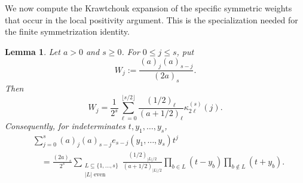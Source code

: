 \documentclass[12pt]{amsart}
\newtheorem{Lemma}[Theorem]{Lemma}
\theoremstyle{definition}
\begin{document}
We now compute the Krawtchouk expansion of the specific symmetric weights
that occur in the local positivity argument.  This is the specialization
needed for the finite symmetrization identity.

\begin{Lemma} \label{lem:finite-symmetrization}
Let $a>0$ and $s\ge0$.  For $0\le j\le s$, put
\[
W_j:=\frac{(a)_j(a)_{s-j}}{(2a)_s}.
\]
Then
\begin{equation}\label{9.4}
W_j
=
\frac1{2^s}
\sum_{\ell=0}^{\lfloor s/2\rfloor}
\frac{(1/2)_\ell}{(a+1/2)_\ell}
\kappa_{2\ell}^{(s)}(j).
\end{equation}
Consequently, for indeterminates $t,y_1,\ldots,y_s$,
\begin{equation}\label{9.5}
\begin{aligned}
&\sum_{j=0}^s
(a)_j(a)_{s-j}e_{s-j}(y_1,\ldots,y_s)t^j\\
&\quad=
\frac{(2a)_s}{2^s}
\sum_{\substack{L\subseteq\{1,\ldots,s\}\\|L|\text{ even}}}
\frac{(1/2)_{|L|/2}}{(a+1/2)_{|L|/2}}
\prod_{b\in L}(t-y_b)
\prod_{b\notin L}(t+y_b).
\end{aligned}
\end{equation}
\end{Lemma}
\end{document}
